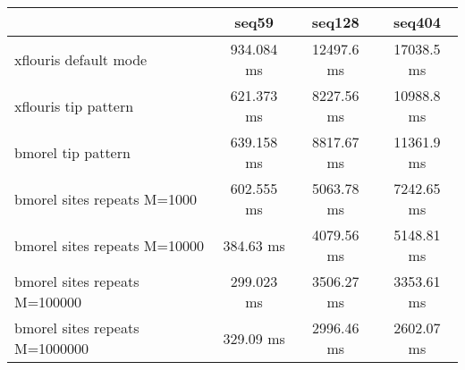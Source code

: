 \begin{tabular}{|l|c|c|c|}
\hline
 & seq59 & seq128 & seq404 \\
\hline
xflouris default mode & 934.084 ms & 12497.6 ms & 17038.5 ms\\
\hline
xflouris tip pattern & 621.373 ms & 8227.56 ms & 10988.8 ms\\
\hline
bmorel tip pattern & 639.158 ms & 8817.67 ms & 11361.9 ms\\
\hline
bmorel sites repeats M=1000 & 602.555 ms & 5063.78 ms & 7242.65 ms\\
\hline
bmorel sites repeats M=10000 & 384.63 ms & 4079.56 ms & 5148.81 ms\\
\hline
bmorel sites repeats M=100000 & 299.023 ms & 3506.27 ms & 3353.61 ms\\
\hline
bmorel sites repeats M=1000000 & 329.09 ms & 2996.46 ms & 2602.07 ms\\
\hline
\end{tabular}
